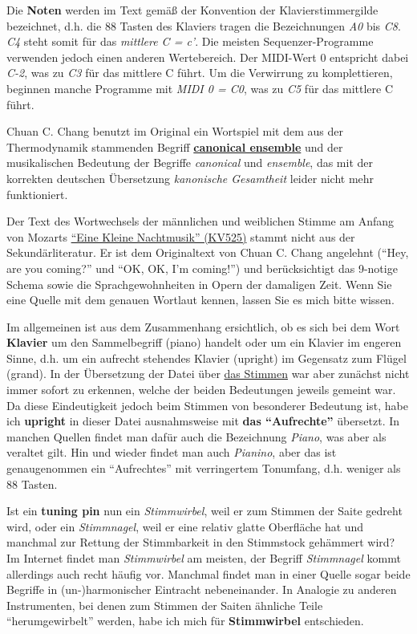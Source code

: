 \label{Noten}

Die \textbf{Noten} werden im Text gemäß der Konvention der Klavierstimmergilde bezeichnet, d.h. die 88 Tasten des Klaviers tragen die Bezeichnungen \textit{A0} bis \textit{C8}.
\textit{C4} steht somit für das \textit{mittlere C = c'}.
Die meisten Sequenzer-Programme verwenden jedoch einen anderen Wertebereich.
Der MIDI-Wert 0 entspricht dabei \textit{C-2}, was zu \textit{C3} für das mittlere C führt.
Um die Verwirrung zu komplettieren, beginnen manche Programme mit \textit{MIDI 0 = C0}, was zu \textit{C5} für das mittlere C führt.


\label{ueb-canonic}
Chuan C. Chang benutzt im Original ein Wortspiel mit dem aus der Thermodynamik stammenden Begriff \hyperref[canonic]{\textbf{canonical ensemble}} und der musikalischen Bedeutung der Begriffe \textit{canonical} und \textit{ensemble}, das mit der korrekten deutschen Übersetzung \textit{kanonische Gesamtheit} leider nicht mehr funktioniert.


\label{ueb-KV525}
Der Text des Wortwechsels der männlichen und weiblichen Stimme am Anfang von Mozarts \hyperref[KV525]{\enquote{Eine Kleine Nachtmusik} (KV525)} stammt nicht aus der Sekundärliteratur.
Er ist dem Originaltext von Chuan C. Chang angelehnt (\enquote{Hey, are you coming?} und \enquote{OK, OK, I'm coming!}) und berücksichtigt das 9-notige Schema sowie die Sprachgewohnheiten in Opern der damaligen Zeit.
Wenn Sie eine Quelle mit dem genauen Wortlaut kennen, lassen Sie es mich bitte wissen.


\label{upright}
Im allgemeinen ist aus dem Zusammenhang ersichtlich, ob es sich bei dem Wort \textbf{Klavier} um den Sammelbegriff (piano) handelt oder um ein Klavier im engeren Sinne, d.h. um ein aufrecht stehendes Klavier (upright) im Gegensatz zum Flügel (grand).
In der Übersetzung der Datei über \hyperref[c2_1]{das Stimmen} war aber zunächst nicht immer sofort zu erkennen, welche der beiden Bedeutungen jeweils gemeint war.
Da diese Eindeutigkeit jedoch beim Stimmen von besonderer Bedeutung ist, habe ich \textbf{upright} in dieser Datei ausnahmsweise mit \textbf{das \enquote{Aufrechte}} übersetzt.
In manchen Quellen findet man dafür auch die Bezeichnung \textit{Piano}, was aber als veraltet gilt.
Hin und wieder findet man auch \textit{Pianino}, aber das ist genaugenommen ein \enquote{Aufrechtes} mit verringertem Tonumfang, d.h. weniger als 88 Tasten.


\label{pin}
Ist ein \textbf{tuning pin} nun ein \textit{Stimmwirbel}, weil er zum Stimmen der Saite gedreht wird, oder ein \textit{Stimmnagel}, weil er eine relativ glatte Oberfläche hat und manchmal zur Rettung der Stimmbarkeit in den Stimmstock gehämmert wird?
Im Internet findet man \textit{Stimmwirbel} am meisten, der Begriff \textit{Stimmnagel} kommt allerdings auch recht häufig vor.
Manchmal findet man in einer Quelle sogar beide Begriffe in (un-)harmonischer Eintracht nebeneinander.
In Analogie zu anderen Instrumenten, bei denen zum Stimmen der Saiten ähnliche Teile \enquote{herumgewirbelt} werden, habe ich mich für \textbf{Stimmwirbel} entschieden. 



